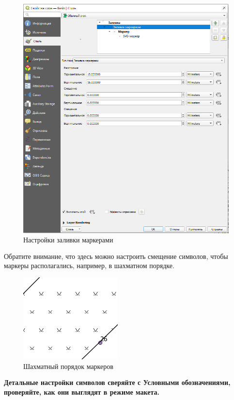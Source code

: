 \documentclass[
  12pt,
]{book}
\begin{document}
\begin{figure}
\centering
\includegraphics{images/symbology/Marker_shifting.png}
\caption{Настройки заливки маркерами}
\end{figure}

Обратите внимание, что здесь можно настроить смещение символов, чтобы маркеры располагались, например, в шахматном порядке.

\begin{figure}
\centering
\includegraphics{images/symbology/Chess_placement.png}
\caption{Шахматный порядок маркеров}
\end{figure}

\textbf{Детальные настройки символов сверяйте с Условными обозначениями, проверяйте, как они выглядят в режиме макета.}
\end{document}
